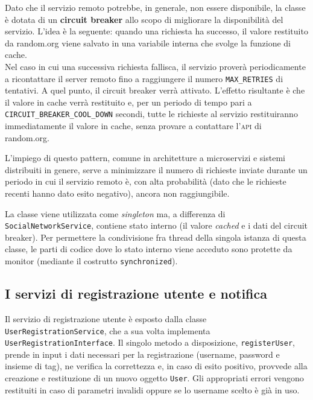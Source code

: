 \documentclass[a4paper,8pt]{article} %
\def\code#1{\texttt{#1}}
\begin{document}
\par Dato che il servizio remoto potrebbe, in generale, non essere disponibile, la classe è dotata di un \textbf{circuit breaker} allo scopo di migliorare la disponibilità del servizio.
L'idea è la seguente: quando una richiesta ha successo, il valore restituito da random.org viene salvato in una variabile interna che svolge la funzione di cache.\\
Nel caso in cui una successiva richiesta fallisca,
il servizio proverà periodicamente a ricontattare il server remoto fino a raggiungere il numero \code{MAX\_RETRIES} di tentativi. A quel punto, il circuit breaker verrà attivato. L'effetto risultante è che il valore in cache verrà
restituito e, per un periodo di tempo pari a \code{CIRCUIT\_BREAKER\_COOL\_DOWN} secondi, tutte le richieste al servizio restituiranno immediatamente il valore in cache, senza provare a contattare l'\textsc{api} di random.org.
\par L'impiego di questo pattern, comune in architetture a microservizi e sistemi distribuiti in genere, serve a minimizzare il numero di richieste inviate durante un periodo in cui il servizio remoto è, con alta probabilità (dato che le richieste recenti hanno dato esito negativo), ancora non raggiungibile.

\par La classe viene utilizzata come \emph{singleton} ma, a differenza di \code{SocialNetworkService}, contiene stato interno (il valore \emph{cached} e i dati del circuit breaker).
Per permettere la condivisione fra thread della singola istanza di questa classe, le parti di codice dove lo stato interno viene acceduto sono protette da monitor (mediante il costrutto \code{synchronized}).

\subsection{I servizi di registrazione utente e notifica}
Il servizio di registrazione utente è esposto dalla classe \code{UserRegistrationService}, che a sua volta implementa \code{UserRegistrationInterface}.
Il singolo metodo a disposizione, \code{registerUser}, prende in input i dati necessari per la registrazione (username, password e insieme di tag), ne verifica la correttezza e,
in caso di esito positivo, provvede alla creazione e restituzione di un nuovo oggetto \code{User}. Gli appropriati errori vengono restituiti in caso di parametri invalidi oppure se lo username
scelto è già in uso.
\end{document}
